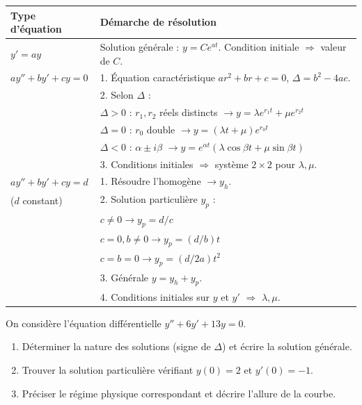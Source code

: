 \documentclass[11pt]{article}
\begin{document}
\begin{center}
\begin{tabularx}{\linewidth}{|l|X|}
\hline
\rowcolor{popblueL} \textbf{Type d'équation} & \textbf{Démarche de résolution} \\
\hline
$y' = a y$ & Solution générale : $y = C e^{a t}$. Condition initiale $\Rightarrow$ valeur de $C$. \\
\hline
$a y'' + b y' + c y = 0$ & 1. Équation caractéristique $a r^2 + b r + c = 0$, $\Delta = b^2 - 4ac$. \\
& 2. Selon $\Delta$ : \\
& \quad $\Delta > 0$ : $r_1, r_2$ réels distincts $\to y = \lambda e^{r_1 t} + \mu e^{r_2 t}$ \\
& \quad $\Delta = 0$ : $r_0$ double $\to y = (\lambda t + \mu) e^{r_0 t}$ \\
& \quad $\Delta < 0$ : $\alpha \pm i\beta$ $\to y = e^{\alpha t}(\lambda \cos \beta t + \mu \sin \beta t)$ \\
& 3. Conditions initiales $\Rightarrow$ système $2\times 2$ pour $\lambda, \mu$. \\
\hline
$a y'' + b y' + c y = d$ & 1. Résoudre l'homogène $\to y_h$. \\
($d$ constant) & 2. Solution particulière $y_p$ : \\
& \quad $c \neq 0 \to y_p = d/c$ \\
& \quad $c=0, b\neq 0 \to y_p = (d/b)t$ \\
& \quad $c=b=0 \to y_p = (d/2a)t^2$ \\
& 3. Générale $y = y_h + y_p$. \\
& 4. Conditions initiales sur $y$ et $y'$ $\Rightarrow$ $\lambda, \mu$. \\
\hline
\end{tabularx}
\end{center}

\begin{exercice}
On considère l'équation différentielle $y'' + 6y' + 13y = 0$.
\begin{enumerate}
\item Déterminer la nature des solutions (signe de $\Delta$) et écrire la solution générale.
\item Trouver la solution particulière vérifiant $y(0) = 2$ et $y'(0) = -1$.
\item Préciser le régime physique correspondant et décrire l'allure de la courbe.
\end{enumerate}
\end{exercice}
\end{document}
